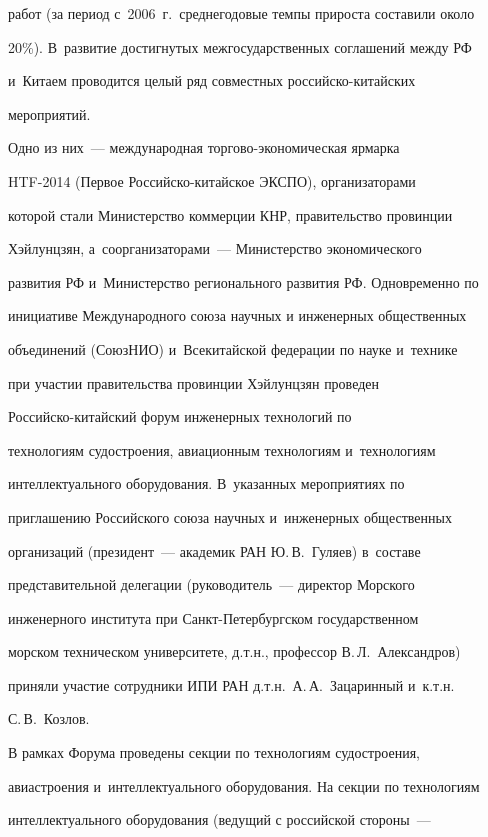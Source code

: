 работ (за период с~2006~г.\ среднегодовые темпы прироста составили около


20\%). В~развитие достигнутых межгосударственных соглашений между РФ


и~Китаем проводится целый ряд совместных рос\-сий\-ско-ки\-тай\-ских


мероприятий.


    Одно из них~--- международная торгово-экономическая ярмарка


    HTF-2014 (Первое Рос\-сий\-ско-ки\-тай\-ское ЭКСПО), организаторами


которой стали Министерство коммерции КНР, правительство провинции


Хэйлунцзян, а~соорганизаторами~--- Министерство экономического


развития РФ и~Министерство регионального развития РФ. Одновременно по


инициативе Международного союза научных и инженерных общественных


объединений (СоюзНИО) и~Всекитайской федерации по науке и~технике


при участии правительства провинции Хэйлунцзян проведен


    Рос\-сий\-ско-ки\-тай\-ский форум инженерных технологий по


технологиям судостроения, авиационным технологиям и~технологиям


интеллектуального оборудования. В~указанных мероприятиях по


приглашению Российского союза научных и~инженерных общественных


организаций (президент~--- академик РАН Ю.\,В.~Гуляев) в~составе


представительной делегации (руководитель~--- директор Морского


инженерного института при Санкт-Пе\-тер\-бург\-ском государственном


морском техническом университете, д.т.н., профессор В.\,Л.~Александров)


приняли участие сотрудники ИПИ РАН д.т.н.\ А.\,А.~Зацаринный и~к.т.н.\


С.\,В.~Козлов.





    В рамках Форума проведены секции по технологиям судостроения,


авиастроения и~интеллектуального оборудования. На секции по технологиям


интеллектуального оборудования (ведущий с российской стороны~---


